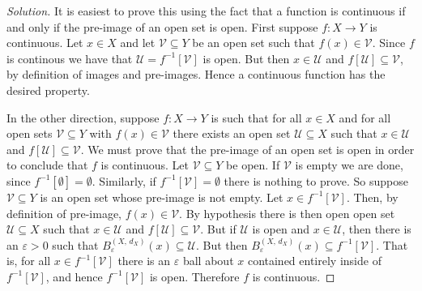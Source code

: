 \documentclass{article}
\theoremstyle{normal}
\begin{document}
    \begin{proof}[Solution]
        It is easiest to prove this using the fact that a function is continuous
        if and only if the pre-image of an open set is open. First suppose
        $f:X\rightarrow{Y}$ is continuous. Let $x\in{X}$ and let
        $\mathcal{V}\subseteq{Y}$ be an open set such that $f(x)\in\mathcal{V}$.
        Since $f$ is continous we have that $\mathcal{U}=f^{-1}[\mathcal{V}]$
        is open. But then $x\in\mathcal{U}$ and
        $f[\mathcal{U}]\subseteq\mathcal{V}$, by definition of images and
        pre-images. Hence a continuous function has the desired property.
        \par\hfill\par
        In the other direction, suppose $f:X\rightarrow{Y}$ is such that for all
        $x\in{X}$ and for all open sets $\mathcal{V}\subseteq{Y}$ with
        $f(x)\in\mathcal{V}$ there exists an open set $\mathcal{U}\subseteq{X}$
        such that $x\in\mathcal{U}$ and $f[\mathcal{U}]\subseteq\mathcal{V}$.
        We must prove that the pre-image of an open set is open in order to
        conclude that $f$ is continuous. Let $\mathcal{V}\subseteq{Y}$ be open.
        If $\mathcal{V}$ is empty we are done, since
        $f^{-1}[\emptyset]=\emptyset$. Similarly, if
        $f^{-1}[\mathcal{V}]=\emptyset$ there is nothing to prove. So suppose
        $\mathcal{V}\subseteq{Y}$ is an open set whose pre-image is not empty.
        Let $x\in{f}^{-1}[\mathcal{V}]$. Then, by definition of pre-image,
        $f(x)\in\mathcal{V}$. By hypothesis there is then open open set
        $\mathcal{U}\subseteq{X}$ such that $x\in\mathcal{U}$ and
        $f[\mathcal{U}]\subseteq\mathcal{V}$. But if $\mathcal{U}$ is open and
        $x\in\mathcal{U}$, then there is an $\varepsilon>0$ such that
        $B_{\varepsilon}^{(X,\,d_{X})}(x)\subseteq\mathcal{U}$. But then
        $B_{\varepsilon}^{(X,\,d_{X})}(x)\subseteq{f}^{-1}[\mathcal{V}]$. That
        is, for all $x\in{f}^{-1}[\mathcal{V}]$ there is an $\varepsilon$ ball
        about $x$ contained entirely inside of $f^{-1}[\mathcal{V}]$, and hence
        $f^{-1}[\mathcal{V}]$ is open. Therefore $f$ is continuous.
    \end{proof}
    \newpage
    \color{blue}
\end{document}
